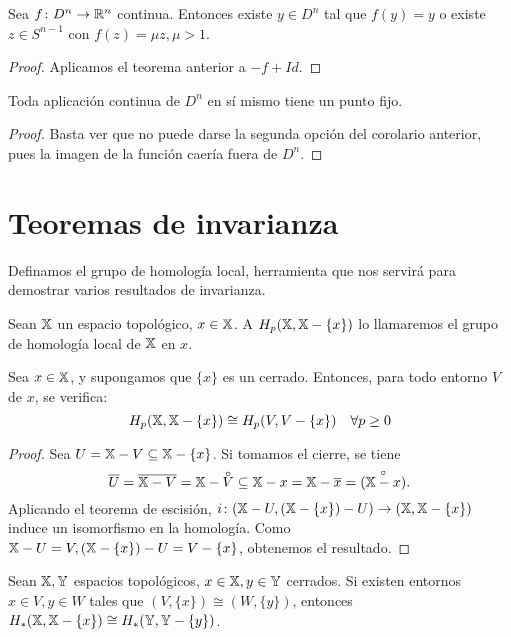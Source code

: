 \begin{corollary}
  Sea $f \colon D^n \to \mathbb{R}^n$ continua. Entonces existe $y \in D^n$ tal que $f(y) = y$ o existe $z \in S^{n-1}$ con $f(z) = \mu z, \mu > 1$.
\end{corollary}

\begin{proof}
  Aplicamos el teorema anterior a $-f + Id$.
\end{proof}

\begin{corollary}
  Toda aplicación continua de $D^n$ en sí mismo tiene un punto fijo.
\end{corollary}

\begin{proof}
  Basta ver que no puede darse la segunda opción del corolario anterior, pues la imagen de la función caería fuera de $D^n$.
\end{proof}

\section{Teoremas de invarianza}

Definamos el grupo de homología local, herramienta que nos servirá para demostrar varios resultados de invarianza.

\begin{definition}
  Sean ${\mathbb X}$ un espacio topológico, $x \in {\mathbb X}$. A $H_p({\mathbb X}, {\mathbb X} - \{x\})$ lo llamaremos el grupo de homología local de ${\mathbb X}$ en $x$.
\end{definition}

\begin{proposition}
  Sea $x \in {\mathbb X}$, y supongamos que $\{x\}$ es un cerrado. Entonces, para todo entorno $V$ de $x$, se verifica:
  \[ H_p({\mathbb X}, {\mathbb X} - \{x\}) \cong H_p(V, V - \{x\}) \quad \forall p \geq 0 \]
\end{proposition}

\begin{proof}
  Sea $U = {\mathbb X} - V \subseteq {\mathbb X} - \{x\}$. Si tomamos el cierre, se tiene
  \[ \overline{U} = \overline{\X - V} = \X - \interior{V} \subseteq \X - x = \X - \overline{x} = \interior{(\X - x)} .\]
  Aplicando el teorema de escisión, $i \colon ({\mathbb X} - U, ({\mathbb X} - \{x\}) - U) \to ({\mathbb X}, {\mathbb X} - \{x\})$ induce un isomorfismo en la homología.
  Como ${\mathbb X} - U = V, ({\mathbb X} - \{x\}) - U = V - \{x\}$, obtenemos el resultado.
\end{proof}

\begin{proposition}
  Sean ${\mathbb X}, {\mathbb Y}$ espacios topológicos, $x \in {\mathbb X}, y \in {\mathbb Y}$ cerrados. Si existen entornos $x \in V, y \in W$ tales que $(V, \{x\}) \cong (W, \{y\})$,
  entonces $H_*({\mathbb X}, {\mathbb X} - \{x\}) \cong H_*({\mathbb Y}, {\mathbb Y} - \{y\})$.
\end{proposition}


